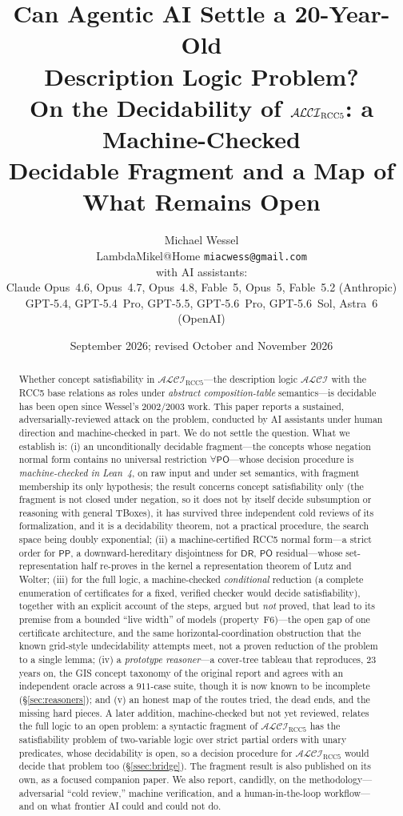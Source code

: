 \documentclass[11pt]{article}
\title{Can Agentic AI Settle a 20-Year-Old\\ Description Logic Problem?\\[0.35em]
\large On the Decidability of $\ALCIRCC{5}$: a Machine-Checked\\
Decidable Fragment and a Map of What Remains Open}
\author{Michael Wessel\\
\small LambdaMikel@Home \quad\textbullet\quad \texttt{miacwess@gmail.com}\\[0.45em]
\small with AI assistants:\\
\small Claude Opus~4.6, Opus~4.7, Opus~4.8, Fable~5, Opus~5, Fable~5.2 \;(Anthropic)\\
\small GPT-5.4, GPT-5.4~Pro, GPT-5.5, GPT-5.6~Pro, GPT-5.6~Sol, Astra~6 \;(OpenAI)}
\date{September 2026; revised October and November 2026}
\newcommand{\ALCIRCC}[1]{\mathcal{ALCI}_{\mathrm{RCC#1}}}
\newcommand{\DR}{\mathsf{DR}}
\newcommand{\PO}{\mathsf{PO}}
\newcommand{\PP}{\mathsf{PP}}
\theoremstyle{plain}
\theoremstyle{definition}
\begin{document}
\maketitle

\begin{abstract}
Whether concept satisfiability in $\ALCIRCC{5}$---the description logic
$\mathcal{ALCI}$ with the RCC5 base relations as roles under
\emph{abstract composition-table} semantics---is decidable has been open
since Wessel's 2002/2003 work. This paper reports a
sustained, adversarially-reviewed attack on the problem, conducted by AI
assistants under human direction and machine-checked in part. We do not
settle the question. What we establish is: (i) an unconditionally decidable
fragment---the concepts whose negation normal form contains no universal
restriction $\forall\PO$---whose decision procedure is \emph{machine-checked
in Lean~4}, on raw input and under set semantics, with fragment membership
its only hypothesis; the result concerns concept satisfiability only (the
fragment is not closed under negation, so it does not by itself decide
subsumption or reasoning with general TBoxes), it has survived three
independent cold reviews of its formalization, and it is a decidability
theorem, not a practical procedure, the search space being doubly
exponential; (ii) a machine-certified RCC5 normal form---a strict order for
$\PP$, a downward-hereditary disjointness for $\DR$, $\PO$ residual---whose
set-representation half re-proves in the kernel a representation theorem of
Lutz and Wolter; (iii) for the full logic, a machine-checked
\emph{conditional} reduction (a complete enumeration of certificates for a
fixed, verified checker would decide satisfiability), together with an
explicit account of the steps, argued but \emph{not} proved, that lead to
its premise from a bounded ``live width'' of models (property~F6)---the open
gap of one certificate architecture, and the same horizontal-coordination
obstruction that the known grid-style undecidability attempts meet, not a
proven reduction of the problem to a single lemma; (iv) a \emph{prototype
reasoner}---a cover-tree tableau that reproduces, $23$ years on, the GIS
concept taxonomy of the original report and agrees with an independent
oracle across a $911$-case suite, though it is now known to be incomplete
(\S\ref{sec:reasoners}); and (v)
an honest map of the routes
tried, the dead ends, and the missing hard pieces. A later addition,
machine-checked but not yet reviewed, relates the full logic to an open
problem: a syntactic fragment of $\ALCIRCC{5}$ has the satisfiability problem
of two-variable logic over strict partial orders with unary predicates, whose
decidability is open, so a decision procedure for $\ALCIRCC{5}$ would decide
that problem too (\S\ref{ssec:bridge}). The fragment result is
also published on its own, as a focused companion paper. We also report,
candidly, on
the methodology---adversarial ``cold review,'' machine verification, and
a human-in-the-loop workflow---and on what frontier AI could and could
not do.
\end{abstract}
\end{document}
